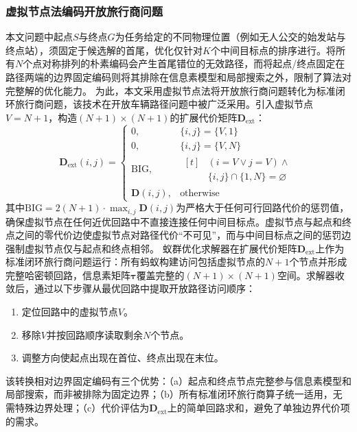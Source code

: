 \documentclass[lettersize,journal]{IEEEtran}
\begin{document}
\subsubsection{虚拟节点法编码开放旅行商问题}
\label{subsec:virtual}
本文问题中起点$S$与终点$G$为任务给定的不同物理位置（例如无人公交的始发站与终点站），须固定于候选解的首尾，优化仅针对$K$个中间目标点的排序进行。将所有$N$个点对称排列的朴素编码会产生首尾错位的无效路径，而将起点/终点固定在路径两端的边界固定编码则将其排除在信息素模型和局部搜索之外，限制了算法对完整解的优化能力。
为此，本文采用虚拟节点法将开放旅行商问题转化为标准闭环旅行商问题，该技术在开放车辆路径问题中被广泛采用\textcolor{blue}{\cite{ref31,ref32}}。引入虚拟节点$V = N + 1$，构造$(N+1) \times (N+1)$的扩展代价矩阵$\mathbf{D}_{\mathrm{ext}}$：
\begin{equation}
\mathbf{D}_{\mathrm{ext}}(i, j) =
\begin{cases}
0, & \{i, j\} = \{V, 1\} \\
0, & \{i, j\} = \{V, N\} \\
\mathrm{BIG}, & \begin{aligned}[t]
& (i = V \lor j = V) \land \\
& \{i, j\} \cap \{1, N\} = \varnothing
\end{aligned} \\
\mathbf{D}(i, j), & \text{otherwise}
\end{cases}
\label{eq:dext}
\end{equation}
其中$\mathrm{BIG} = 2(N+1) \cdot \max_{i,j} \mathbf{D}(i,j)$为严格大于任何可行回路代价的惩罚值，确保虚拟节点在任何近优回路中不直接连接任何中间目标点。虚拟节点与起点和终点之间的零代价边使虚拟节点对路径代价``不可见''，而与中间目标点之间的惩罚边强制虚拟节点仅与起点和终点相邻。
蚁群优化求解器在扩展代价矩阵$\mathbf{D}_{\mathrm{ext}}$上作为标准闭环旅行商问题运行：所有蚂蚁构建访问包括虚拟节点的$N+1$个节点并形成完整哈密顿回路，信息素矩阵$\bm{\tau}$覆盖完整的$(N+1) \times (N+1)$空间。求解器收敛后，通过以下步骤从最优回路中提取开放路径访问顺序：
\begin{enumerate}
\item 定位回路中的虚拟节点$V$。
\item 移除$V$并按回路顺序读取剩余$N$个节点。
\item 调整方向使起点出现在首位、终点出现在末位。
\end{enumerate}
该转换相对边界固定编码有三个优势：（a）起点和终点节点完整参与信息素模型和局部搜索，而非被排除为固定边界；（b）所有标准闭环旅行商算子统一适用，无需特殊边界处理；（c）代价评估为$\mathbf{D}_{\mathrm{ext}}$上的简单回路求和，避免了单独边界代价项的需求。
\end{document}
